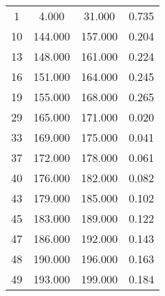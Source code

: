 % 
\begin{tabular}{cccc}
  \hline
  \hline
1 & 4.000 & 31.000 & 0.735 \\ 
  10 & 144.000 & 157.000 & 0.204 \\ 
  13 & 148.000 & 161.000 & 0.224 \\ 
  16 & 151.000 & 164.000 & 0.245 \\ 
  19 & 155.000 & 168.000 & 0.265 \\ 
  29 & 165.000 & 171.000 & 0.020 \\ 
  33 & 169.000 & 175.000 & 0.041 \\ 
  37 & 172.000 & 178.000 & 0.061 \\ 
  40 & 176.000 & 182.000 & 0.082 \\ 
  43 & 179.000 & 185.000 & 0.102 \\ 
  45 & 183.000 & 189.000 & 0.122 \\ 
  47 & 186.000 & 192.000 & 0.143 \\ 
  48 & 190.000 & 196.000 & 0.163 \\ 
  49 & 193.000 & 199.000 & 0.184 \\ 
   \hline
\end{tabular}
